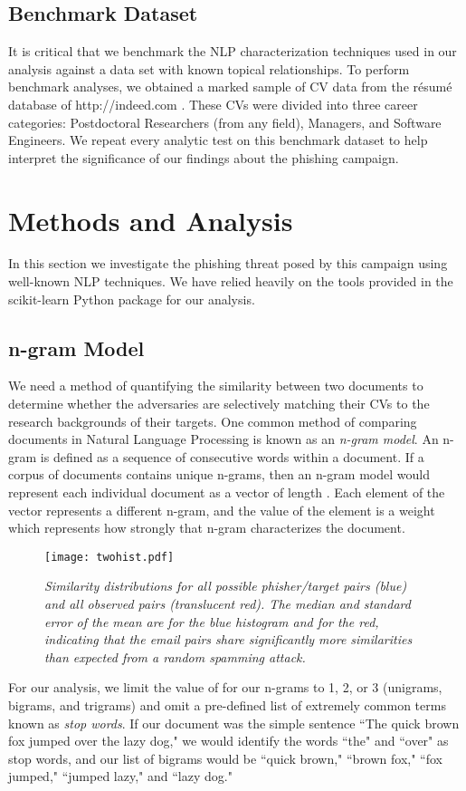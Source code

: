 \documentclass[conference]{IEEEtran}
\begin{document}
\subsection{Benchmark Dataset}

It is critical that we benchmark the NLP characterization 
techniques used in our analysis against a data set with known topical relationships.  To perform benchmark analyses, we obtained a marked sample of CV data from the r\'esum\'e database of http://indeed.com 
\cite{indeed}.  These CVs were divided into three career categories: Postdoctoral Researchers (from any field), Managers, and Software Engineers.  We repeat every analytic test on this benchmark dataset to 
help interpret the significance of our findings about the phishing campaign.

\section{Methods and Analysis}
In this section we investigate the phishing threat posed by this campaign using well-known NLP techniques.  We have relied heavily on the
tools provided in the scikit-learn Python package \cite{scikit-learn} for our analysis. 
\subsection{n-gram Model}
We need a method of quantifying the similarity between two documents to determine whether the adversaries are selectively matching their CVs to the research backgrounds of their targets.  One common 
method of comparing documents in Natural Language Processing is known as an \emph{n-gram model}.  An n-gram is defined as a sequence of  consecutive words within a document.  If a corpus of 
documents contains  unique n-grams, then an n-gram model would represent each individual document as a vector of length .  Each element of the vector represents a different n-gram, and the value 
of the element is a weight which represents how strongly that n-gram characterizes the document.

\begin{figure}[t!] \begin{center}
\texttt{[image: twohist.pdf]}
\caption{\sl Similarity distributions for all possible phisher/target pairs (blue) and all observed pairs (translucent red).  
The median and standard error of the mean are  for the blue 
histogram and  for the red, indicating that the email pairs share significantly more similarities than expected from a random spamming attack. \label{fig:twohist}}
\end{center}
\end{figure}
For our analysis, we limit the value of  for our n-grams to 1, 2, or 3 (unigrams, bigrams, and trigrams) and omit a pre-defined list of extremely common terms known as \emph{stop words}.  If our document 
was the simple sentence ``The quick brown fox jumped over the lazy dog," we would identify the words ``the" and ``over" as stop words, and our list of bigrams would be ``quick brown," ``brown fox," ``fox 
jumped," ``jumped lazy," and ``lazy dog."
\end{document}
